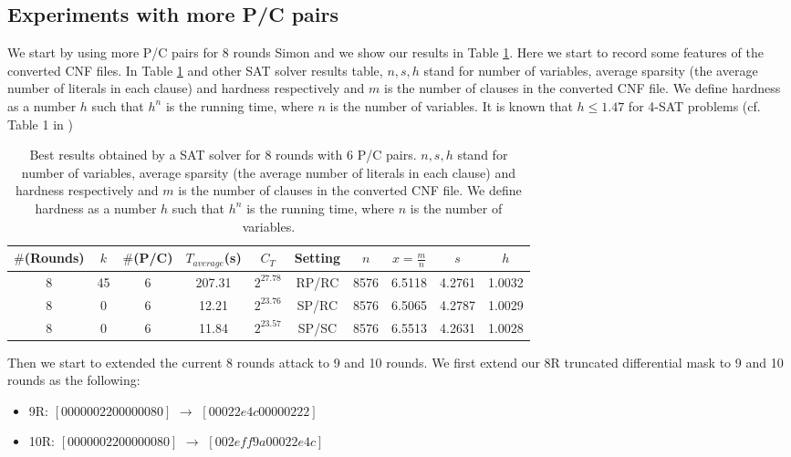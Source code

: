 \subsection{Experiments with more P/C pairs}
We start by using more P/C pairs for 8 rounds Simon and we show our results in Table \ref{tab:8RmorePC}. Here we start to record some features of the converted CNF files. In Table \ref{tab:8RmorePC} and other SAT solver results table, $n,s,h$ stand for number of variables, average sparsity (the average number of literals in each clause) and hardness respectively and $m$ is the number of clauses in the converted CNF file.
We define hardness as a number $h$ such that $h^n$ is the running time, where $n$ is the number of variables.
It is known that $h\leq 1.47$ for 4-SAT problems (cf. Table 1 in \cite{semaev})

\begin{table}[!hh]
	\caption[Best results obtained by a SAT solver for 8 rounds with 6 P/C pairs]{Best results obtained by a SAT solver for 8 rounds with 6 P/C pairs. $n,s,h$ stand for number of variables, average sparsity (the average number of literals in each clause) and hardness respectively and $m$ is the number of clauses in the converted CNF file.
		We define hardness as a number $h$ such that $h^n$ is the running time, where $n$ is the number of variables. }\label{tab:8RmorePC} \centering
	\begin{tabular}{|c|c|c|c|c|c|c|c|c|c|}
		\hline
		$\#$(Rounds) & $k$ & $\#$(P/C) & $T_{average}$(s) & $C_T$ & Setting & $n$ & $x=\frac{m}{n}$ & $s$ & $h$ \\
		\hline
		8 & 45 & 6 & 207.31   & $2^{27.78}$ & RP/RC & 8576	& 6.5118	& 4.2761	& 1.0032 \\
		\hline
		8 & 0  & 6 & 12.21   & $2^{23.76}$ & SP/RC  & 8576	& 6.5065	& 4.2787	& 1.0029  \\
		\hline
		8 & 0  & 6 & 11.84   & $2^{23.57}$ & SP/SC  & 8576	& 6.5513	& 4.2631	& 1.0028 \\
		\hline
	\end{tabular}
\end{table}


Then we start to extended the current 8 rounds attack to 9 and 10 rounds. We first extend our 8R truncated differential mask to 9 and 10 rounds as the following:
\begin{itemize}
	\item 9R: $[00000022 00000080]$ $\rightarrow$ $[00022e4c 00000222]$
	\item 10R: $[00000022 00000080]$ $\rightarrow$ $[002eff9a 00022e4c]$ 
\end{itemize}

